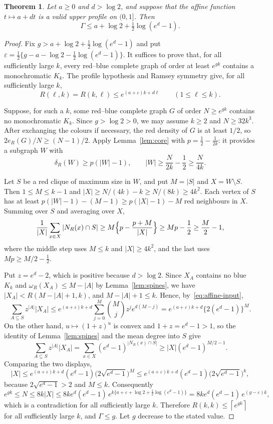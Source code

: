 \documentclass[11pt]{article}
\newtheorem{theorem}{Theorem}[section]
\theoremstyle{definition}
\theoremstyle{remark}
\newcommand{\Gam}{\Gamma}
\newcommand{\ceil}[1]{\left\lceil #1\right\rceil}
\numberwithin{equation}{section}
\begin{document}
\begin{theorem}\label{thm:transfer}
Let $a\ge0$ and $d>\log2$, and suppose that the affine function
$t\mapsto a+dt$ is a valid upper profile on $(0,1]$. Then
\[
 \Gam\le a+\log2+\tfrac12\log(e^d-1).
\]
\end{theorem}
\begin{proof}
Fix $g>a+\log2+\tfrac12\log(e^d-1)$ and put
$\varepsilon=\tfrac12\{g-a-\log2-\tfrac12\log(e^d-1)\}$. It suffices to
prove that, for all sufficiently large $k$, every red--blue complete
graph of order at least $e^{gk}$ contains a monochromatic $K_k$. The
profile hypothesis and Ramsey symmetry give, for all sufficiently
large $k$,
\begin{equation}\label{eq:affine-input}
 R(\ell,k)=R(k,\ell)\le e^{(a+\varepsilon)k+d\ell}
 \qquad(1\le\ell\le k).
\end{equation}

Suppose, for such a $k$, some red--blue complete graph $G$ of order
$N\ge e^{gk}$ contains no monochromatic $K_k$. Since $g>\log2>0$, we
may assume $k\ge2$ and $N\ge32k^3$. After exchanging the colours if
necessary, the red density of $G$ is at least $1/2$, so
$2e_R(G)/N\ge(N-1)/2$. Apply Lemma~\ref{lem:core} with
$p=\tfrac12-\tfrac1{2k}$: it provides a subgraph $W$ with
\[
 \delta_R(W)\ge p(|W|-1),\qquad
 |W|\ge\frac N{2k}-\frac12\ge\frac N{4k}.
\]

Let $S$ be a red clique of maximum size in $W$, and put $M=|S|$ and
$X=W\setminus S$. Then $1\le M\le k-1$ and
$|X|\ge N/(4k)-k\ge N/(8k)\ge4k^2$. Each vertex of $S$ has at least
$p(|W|-1)-(M-1)\ge p(|X|-1)-M$ red neighbours in $X$. Summing over $S$
and averaging over $X$,
\[
 \frac1{|X|}\sum_{x\in X}|N_R(x)\cap S|
 \ge M\Bigl\{p-\frac{p+M}{|X|}\Bigr\}
 \ge Mp-\frac12\ge\frac M2-1,
\]
where the middle step uses $M\le k$ and $|X|\ge4k^2$, and the last
uses $Mp\ge M/2-\tfrac12$.

Put $z=e^d-2$, which is positive because $d>\log2$. Since $X_A$
contains no blue $K_k$ and $\omega_R(X_A)\le M-|A|$ by
Lemma~\ref{lem:spines}, we have $|X_A|<R(M-|A|+1,k)$, and
$M-|A|+1\le k$. Hence, by~\eqref{eq:affine-input},
\[
 \sum_{A\subseteq S}z^{|A|}|X_A|
 \le e^{(a+\varepsilon)k+d}\sum_{j=0}^M\binom Mj z^je^{d(M-j)}
 =e^{(a+\varepsilon)k+d}\bigl\{2(e^d-1)\bigr\}^M.
\]
On the other hand, $u\mapsto(1+z)^u$ is convex and $1+z=e^d-1>1$, so
the identity of Lemma~\ref{lem:spines} and the mean degree into $S$
give
\[
 \sum_{A\subseteq S}z^{|A|}|X_A|
 =\sum_{x\in X}(e^d-1)^{|N_R(x)\cap S|}
 \ge|X|(e^d-1)^{M/2-1}.
\]
Comparing the two displays,
\[
 |X|\le e^{(a+\varepsilon)k+d}(e^d-1)
 \bigl(2\sqrt{e^d-1}\bigr)^{M}
 \le e^{(a+\varepsilon)k+d}(e^d-1)\bigl(2\sqrt{e^d-1}\bigr)^{k},
\]
because $2\sqrt{e^d-1}>2$ and $M\le k$. Consequently
\[
 e^{gk}\le N\le8k|X|
 \le8ke^d(e^d-1)\,
 e^{k\{a+\varepsilon+\log2+\frac12\log(e^d-1)\}}
 =8ke^d(e^d-1)\,e^{(g-\varepsilon)k},
\]
which is a contradiction for all sufficiently large $k$. Therefore
$R(k,k)\le\ceil{e^{gk}}$ for all sufficiently large $k$, and $\Gam\le g$.
Let $g$ decrease to the stated value.
\end{proof}
\end{document}
